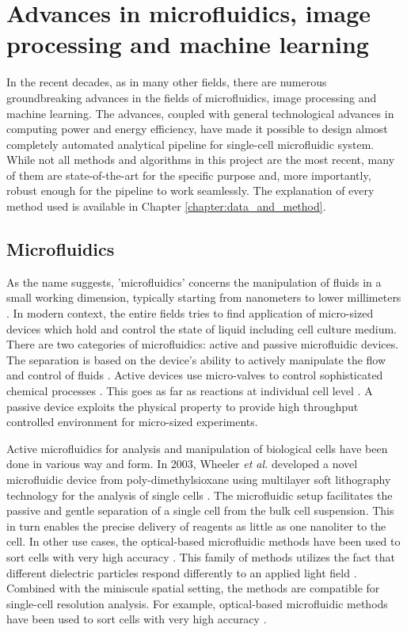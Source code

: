 \documentclass[pdftex,12pt,a4paper]{report}
\begin{document}
\section{Advances in microfluidics, image processing and machine learning}

In the recent decades, as in many other fields, there are numerous groundbreaking advances in the fields of microfluidics, image processing and machine learning. The advances, coupled with general technological advances in computing power and energy efficiency, have made it possible to design almost completely automated analytical pipeline for single-cell microfluidic system. While not all methods and algorithms in this project are the most recent, many of them are state-of-the-art for the specific purpose and, more importantly, robust enough for the pipeline to work seamlessly. The explanation of every method used is available in Chapter \ref{chapter:data_and_method}.

\subsection{Microfluidics}

As the name suggests, 'microfluidics' concerns the manipulation of fluids in a small working dimension, typically starting from nanometers to lower millimeters \cite{whitesides2006origins}. In modern context, the entire fields tries to find application of micro-sized devices which hold and control the state of liquid \cite{whitesides2006origins} including cell culture medium. There are two categories of microfluidics: active and passive microfluidic devices. The separation is based on the device's ability to actively manipulate the flow and control of fluids \cite{sekhavati2015dynamic}. Active devices use micro-valves to control sophisticated chemical processes \cite{marsden1993interdisciplinary}. This goes as far as reactions at individual cell level \cite{eyer2012microchamber}. A passive device exploits the physical property to provide high throughput controlled environment for micro-sized experiments.

Active microfluidics for analysis and manipulation of biological cells have been done in various way and form. In 2003, Wheeler \textit{et al.} developed a novel microfluidic device from poly-dimethylsioxane using multilayer soft lithography technology for the analysis of single cells \cite{wheeler2003microfluidic}. The microfluidic setup facilitates the passive and gentle separation of a single cell from the bulk cell suspension. This in turn enables the precise delivery of reagents as little as one nanoliter to the cell. In other use cases, the optical-based microfluidic methods have been used to sort cells with very high accuracy \cite{macdonald2003microfluidic}. This family of methods utilizes the fact that different dielectric particles respond differently to an applied light field \cite{tatarkova2003brownian}. Combined with the miniscule spatial setting, the methods are compatible for single-cell resolution analysis. For example, optical-based microfluidic methods have been used to sort cells with very high accuracy \cite{macdonald2003microfluidic, wang2005microfluidic, baret2009fluorescence}.
\end{document}
